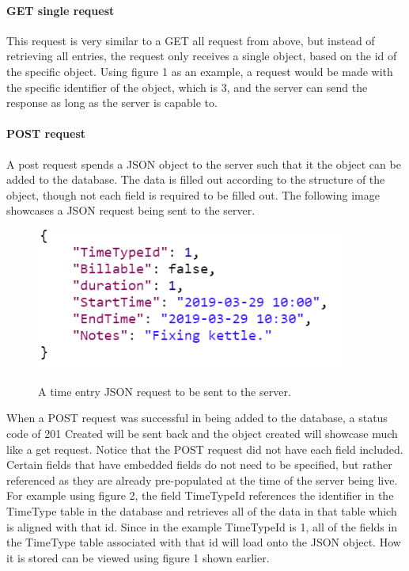 {{{\paragraph{GET single request}
This request is very similar to a GET all request from above, but instead of retrieving all entries, the request only receives a single object, based on the id of the specific object. Using figure 1 as an example, a request would be made with the specific identifier of the object, which is 3, and the server can send the response as long as the server is capable to. 

\newpage
\paragraph{POST request}
A post request spends a JSON object to the server such that it the object can be added to the database. The data is filled out according to the structure of the object, though not each field is required to be filled out. The following image showcases a JSON request being sent to the server. 
\begin{figure}[H]
	\centering
	\includegraphics[width=4in]{JSON-post-send.png}\\
	\caption{A time entry JSON request to be sent to the server.}
	\label{fig:tobias}
\end{figure}

When a POST request was successful in being added to the database, a status code of 201 Created will be sent back and the object created will showcase much like a get request. Notice that the POST request did not have each field included. Certain fields that have embedded fields do not need to be specified, but rather referenced as they are already pre-populated at the time of the server being live. For example using figure 2, the field TimeTypeId references the identifier in the TimeType table in the database and retrieves all of the data in that table which is aligned with that id. Since in the example TimeTypeId is 1, all of the fields in the TimeType table associated with that id will load onto the JSON object. How it is stored can be viewed using figure 1 shown earlier. 

}}}
